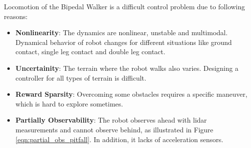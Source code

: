 \documentclass[a4paper, 12pt]{article} %
\begin{document}
Locomotion of the Bipedal Walker is a difficult control problem due to following reasons: 
\begin{itemize}
	\item \textbf{Nonlinearity}: The dynamics are nonlinear, unstable and multimodal. 
	Dynamical behavior of robot changes for different situations 
	like ground contact, single leg contact and double leg contact.
	\item \textbf{Uncertainity}: The terrain where the robot walks also varies. 
	Designing a controller for all types of terrain is difficult.
	\item \textbf{Reward Sparsity}: Overcoming some obstacles requires a specific maneuver, which is hard to explore sometimes.	
	\item \textbf{Partially Observability}: The robot observes 
	ahead with lidar measurements and cannot observe behind, as illustrated in Figure \ref{eqn:partial_obs_pitfall}. 
	In addition, it lacks of acceleration sensors.
\end{itemize}
\end{document}
